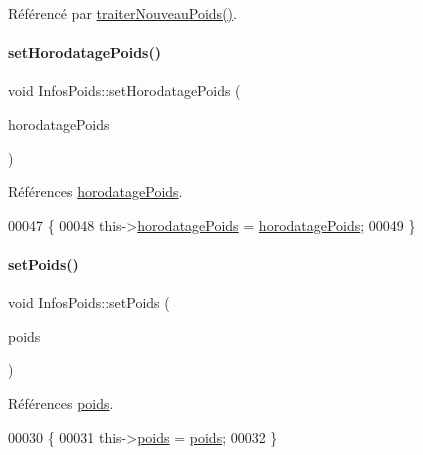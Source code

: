 Référencé par \hyperlink{class_infos_poids_aa5284d38d33adba31ba033b8af61cc96}{traiter\+Nouveau\+Poids()}.

\mbox{\label{class_infos_poids_add0957f341ade104a4521ead7562dff8}} 
\paragraph{\texorpdfstring{set\+Horodatage\+Poids()}{setHorodatagePoids()}}
{\footnotesize\ttfamily void Infos\+Poids\+::set\+Horodatage\+Poids (\begin{DoxyParamCaption}\item[{Q\+String}]{horodatage\+Poids }\end{DoxyParamCaption})}



Références \hyperlink{class_infos_poids_a6cff463552adfdde9430073a87878494}{horodatage\+Poids}.


\begin{DoxyCode}
00047 \{
00048     this->\hyperlink{class_infos_poids_a6cff463552adfdde9430073a87878494}{horodatagePoids} = \hyperlink{class_infos_poids_a6cff463552adfdde9430073a87878494}{horodatagePoids};
00049 \}
\end{DoxyCode}
\mbox{\label{class_infos_poids_a23bb9c5939d0ee5cab0ecf821cdc6779}} 
\paragraph{\texorpdfstring{set\+Poids()}{setPoids()}}
{\footnotesize\ttfamily void Infos\+Poids\+::set\+Poids (\begin{DoxyParamCaption}\item[{double}]{poids }\end{DoxyParamCaption})}



Références \hyperlink{class_infos_poids_ac5faebb99bd0f87f96b442f10349cbd8}{poids}.


\begin{DoxyCode}
00030 \{
00031     this->\hyperlink{class_infos_poids_ac5faebb99bd0f87f96b442f10349cbd8}{poids} = \hyperlink{class_infos_poids_ac5faebb99bd0f87f96b442f10349cbd8}{poids};
00032 \}
\end{DoxyCode}
\mbox{\label{class_infos_poids_aa5284d38d33adba31ba033b8af61cc96}} 
